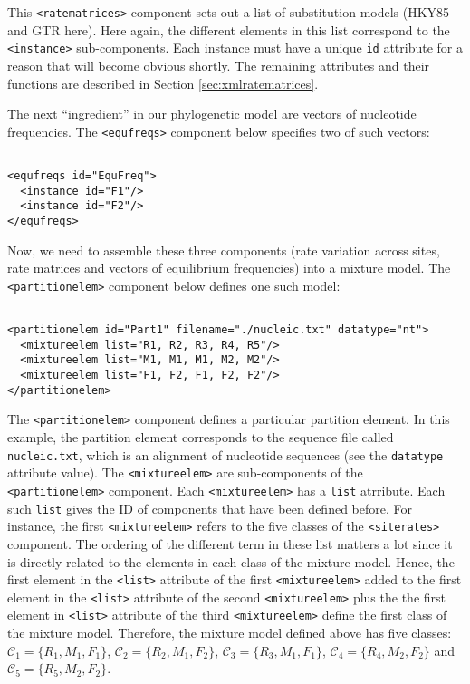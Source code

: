\documentclass[a4paper,12pt]{article}
\newcommand{\x}[1]{\texttt{#1}}
\begin{document}
This \x{<ratematrices>} component sets out a list  of substitution models (HKY85 and GTR here). Here
again, the  different elements in  this list correspond  to the \x{<instance>}  sub-components. Each
instance must  have a unique \x{id}  attribute for a reason  that will become obvious  shortly.  The
remaining attributes and their functions are described in Section \ref{sec:xmlratematrices}.

The next ``ingredient'' in our phylogenetic model are vectors of nucleotide frequencies. The
\x{<equfreqs>} component below specifies two of such vectors:


\vspace{0.2cm}
\begin{Verbatim}[frame=single, label=Equilibrium frequencies, samepage=true, baselinestretch=0.5]

<equfreqs id="EquFreq">
  <instance id="F1"/>
  <instance id="F2"/>
</equfreqs>

\end{Verbatim}

Now, we need to assemble these three components (rate variation across sites, rate matrices and
vectors of equilibrium frequencies) into a mixture model. The \x{<partitionelem>} component below
defines one such model:

\vspace{0.2cm}
\begin{Verbatim}[frame=single, label=Mixture model, samepage=true, baselinestretch=0.5]

<partitionelem id="Part1" filename="./nucleic.txt" datatype="nt">
  <mixtureelem list="R1, R2, R3, R4, R5"/>
  <mixtureelem list="M1, M1, M1, M2, M2"/>
  <mixtureelem list="F1, F2, F1, F2, F2"/>
</partitionelem>

\end{Verbatim}

The  \x{<partitionelem>} component  defines a  particular partition  element. In  this example,  the
partition element corresponds to the sequence file  called \x{nucleic.txt}, which is an alignment of
nucleotide  sequences   (see  the   \x{datatype}  attribute   value).   The   \x{<mixtureelem>}  are
sub-components  of  the  \x{<partitionelem>}  component.   Each  \x{<mixtureelem>}  has  a  \x{list}
atrribute.   Each such  \x{list} gives  the ID  of components  that have  been defined  before.  For
instance,  the  first   \x{<mixtureelem>}  refers  to  the  five  classes   of  the  \x{<siterates>}
component. The  ordering of  the different term  in these list  matters a  lot since it  is directly
related  to the  elements in  each class  of  the mixture  model. Hence,  the first  element in  the
\x{<list>} attribute  of the first  \x{<mixtureelem>} added to the  first element in  the \x{<list>}
attribute of the second \x{<mixtureelem>} plus the  the first element in \x{<list>} attribute of the
third \x{<mixtureelem>} define  the first class of  the mixture model. Therefore,  the mixture model
defined   above   has   five   classes:  $\mathcal{C}_1   =   \{R_1,M_1,F_1\}$,   $\mathcal{C}_2   =
\{R_2,M_1,F_2\}$,  $\mathcal{C}_3   =  \{R_3,M_1,F_1\}$,   $\mathcal{C}_4  =   \{R_4,M_2,F_2\}$  and
$\mathcal{C}_5 = \{R_5,M_2,F_2\}$.
\end{document}
